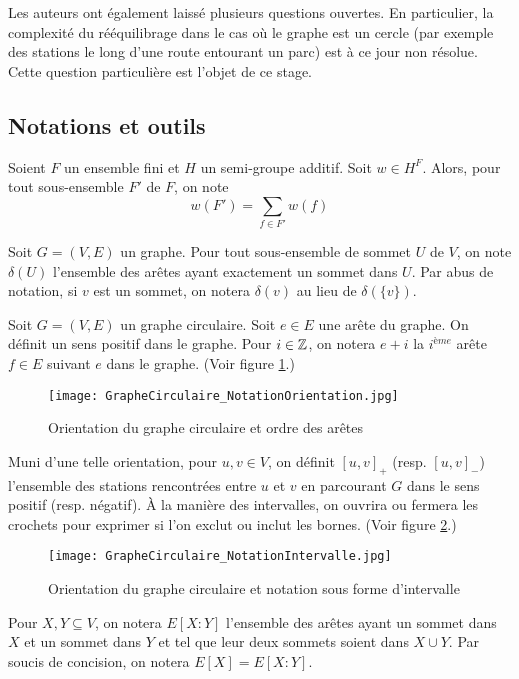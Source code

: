 Les auteurs ont également laissé plusieurs questions ouvertes. En particulier, la complexité du rééquilibrage dans le cas où le graphe est un cercle (par exemple des stations le long d'une route entourant un parc) est à ce jour non résolue. Cette question particulière est l'objet de ce stage.

\subsection{Notations et outils}

Soient $F$ un ensemble fini et $H$ un semi-groupe additif. Soit $w \in H^F$. Alors, pour tout sous-ensemble $F'$ de $F$, on note $$w(F') = \sum_{f \in F'} w(f)$$

Soit $G=(V,E)$ un graphe. Pour tout sous-ensemble de sommet $U$ de $V$, on note $\delta(U)$ l'ensemble des arêtes ayant exactement un sommet dans $U$. Par abus de notation, si $v$ est un sommet, on notera $\delta(v)$ au lieu de $\delta(\{v\})$.

Soit $G=(V,E)$ un graphe circulaire. Soit $e \in E$ une arête du graphe. On définit un sens positif dans le graphe. Pour $i \in \mathbb{Z}$, on notera $e+i$ la $i^{ème}$ arête $f \in E$ suivant $e$ dans le graphe. (Voir figure \ref{Notation orientation graphe circulaire}.)
\begin{figure}[ht]
  \centering
  \texttt{[image: GrapheCirculaire\_NotationOrientation.jpg]}
  \caption{Orientation du graphe circulaire et ordre des arêtes}
  \label{Notation orientation graphe circulaire}
\end{figure}

Muni d'une telle orientation, pour $u,v \in V$, on définit $\left[ u,v \right]_+$ (resp. $\left[ u,v \right]_-$) l'ensemble des stations rencontrées entre $u$ et $v$ en parcourant $G$ dans le sens positif (resp. négatif). \`A la manière des intervalles, on ouvrira ou fermera les crochets pour exprimer si l'on exclut ou inclut les bornes. (Voir figure \ref{Notation intervalle graphe}.)
\begin{figure}[ht]
  \centering
  \texttt{[image: GrapheCirculaire\_NotationIntervalle.jpg]}
  \caption{Orientation du graphe circulaire et notation sous forme d'intervalle}
  \label{Notation intervalle graphe}
\end{figure}

Pour $X,Y \subseteq V$, on notera $E[X:Y]$ l'ensemble des arêtes ayant un sommet dans $X$ et un sommet dans $Y$ et tel que leur deux sommets soient dans $X \cup Y$. Par soucis de concision, on notera $E[X] = E[X:Y]$.

